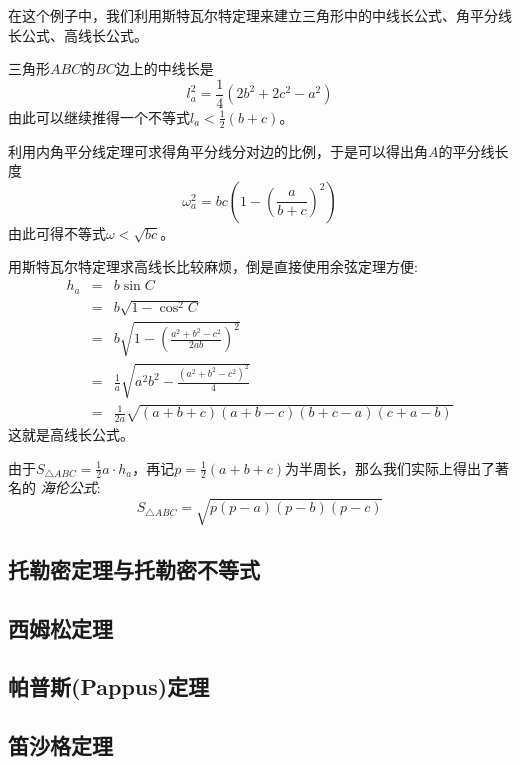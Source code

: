 \begin{example}
  在这个例子中，我们利用斯特瓦尔特定理来建立三角形中的中线长公式、角平分线长公式、高线长公式。

  三角形$ABC$的$BC$边上的中线长是
  \begin{equation}
    \label{eq:midline-length-triangle}
    l_{a}^2 = \frac{1}{4}(2b^2+2c^2-a^2)
  \end{equation}
  由此可以继续推得一个不等式$l_a < \frac{1}{2}(b+c)$。

  利用内角平分线定理可求得角平分线分对边的比例，于是可以得出角$A$的平分线长度
  \begin{equation}
    \label{eq:bisec-angle-length-triangle}
    \omega_a^2 = bc \left( 1 - \left( \frac{a}{b+c} \right)^2 \right)
  \end{equation}
  由此可得不等式$\omega < \sqrt{bc}$。

  用斯特瓦尔特定理求高线长比较麻烦，倒是直接使用余弦定理方便:
  \begin{eqnarray*}
    h_a & = & b \sin{C} \\
       & = & b \sqrt{1-\cos^2{C}} \\
       & = & b \sqrt{1-\left( \frac{a^2+b^2-c^2}{2ab} \right)^2} \\
    & = & \frac{1}{a} \sqrt{a^2b^2-\frac{(a^2+b^2-c^2)^2}{4}} \\
    & = & \frac{1}{2a} \sqrt{(a+b+c)(a+b-c)(b+c-a)(c+a-b)}
  \end{eqnarray*}
  这就是高线长公式。

  由于$S_{\triangle ABC} = \frac{1}{2} a \cdot h_a$，再记$p=\frac{1}{2}(a+b+c)$为半周长，那么我们实际上得出了著名的 \emph{海伦公式}:
  \begin{equation*}
    S_{\triangle ABC} = \sqrt{p(p-a)(p-b)(p-c)}
  \end{equation*}
\end{example}

\subsection{托勒密定理与托勒密不等式}
\label{sec:ptolemy-theorem}

\subsection{西姆松定理}
\label{sec:simson-theorem}

\subsection{帕普斯(Pappus)定理}
\label{sec:pappus-theorem}

\subsection{笛沙格定理}
\label{sec:desargues-theorem}


